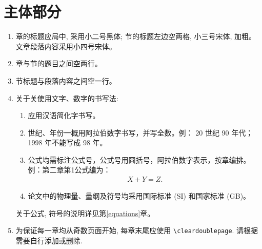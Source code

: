 \section{主体部分}
\begin{enumerate}
    \item 章的标题应局中, 采用小二号黑体; 节的标题左边空两格, 小三号宋体, 加粗。 文章段落内容采用小四号宋体。
    \item 章与节的题目之间空两行。
    \item 节标题与段落内容之间空一行。
    \item 关于关使用文字、数字的书写法:
        \begin{enumerate}
            \item 应用汉语简化字书写。
            \item 世纪、年份一概用阿拉伯数字书写，并写全数。例： 20 世纪 90 年代；1998 年不能写成 98 年。
            \item 公式均需标注公式号，公式号用圆括号，阿拉伯数字表示，按章编排。 \\
                例：第二章第1公式编为：
                \begin{equation}
                    \begin{aligned}
                        X + Y = Z.
                    \end{aligned}
                \end{equation}
            \item 论文中的物理量、量纲及符号均采用国际标准 (SI) 和国家标准 (GB)。
        \end{enumerate}
        关于公式, 符号的说明详见第\ref{equations}章。
    \item 为保证每一章均从奇数页面开始, 每章末尾应使用 \verb|\cleardoublepage|. 请根据需要自行添加或删除.
\end{enumerate}

\cleardoublepage
